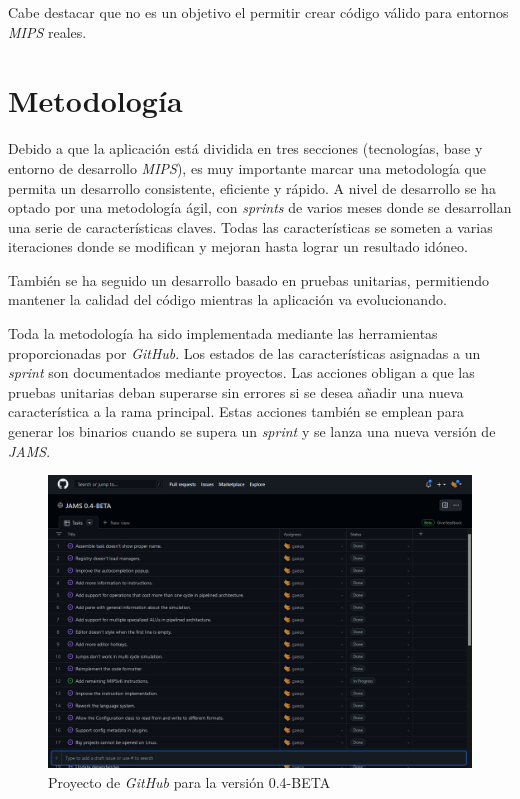 Cabe destacar que no es un objetivo el permitir crear código válido para
entornos \textit{MIPS} reales.


\section{Metodología}\label{sec:metodologia}

Debido a que la aplicación está dividida en tres secciones (tecnologías, base y entorno de desarrollo \textit{MIPS}),
es muy importante marcar una metodología que permita un desarrollo consistente, eficiente y rápido.
A nivel de desarrollo se ha optado por una metodología ágil, con \textit{sprints} de varios meses
donde se desarrollan una serie de características claves.
Todas las características se someten a varias iteraciones donde se modifican y mejoran hasta lograr un
resultado idóneo.

También se ha seguido un desarrollo basado en pruebas unitarias,
permitiendo mantener la calidad del código mientras la aplicación va evolucionando.

Toda la metodología ha sido implementada mediante las herramientas proporcionadas por \textit{GitHub}.
Los estados de las características asignadas a un \textit{sprint} son documentados mediante proyectos.
Las acciones obligan a que las pruebas unitarias deban superarse sin errores si se desea añadir una nueva
característica a la rama principal.
Estas acciones también se emplean para generar los binarios cuando se supera un \textit{sprint}
y se lanza una nueva versión de \textit{JAMS}.

\begin{figure}[H]
    \centering
    \includegraphics[width=\textwidth]{images/introduction/github}
    \caption{Proyecto de \textit{GitHub} para la versión 0.4-BETA}
    \label{fig:introduccion-github}
\end{figure}
